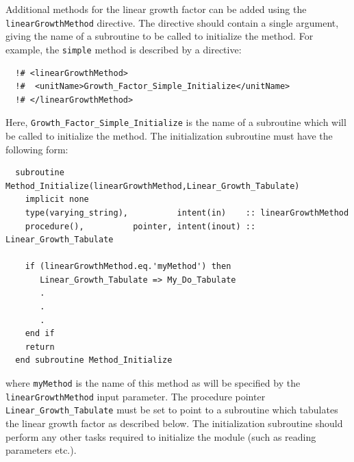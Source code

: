 Additional methods for the linear growth factor can be added using the {\tt linearGrowthMethod} directive. The directive should contain a single argument, giving the name of a subroutine to be called to initialize the method. For example, the {\tt simple} method is described by a directive:
\begin{verbatim}
  !# <linearGrowthMethod>
  !#  <unitName>Growth_Factor_Simple_Initialize</unitName>
  !# </linearGrowthMethod>
\end{verbatim}
Here, {\tt Growth\_Factor\_Simple\_Initialize} is the name of a subroutine which will be called to initialize the method. The initialization subroutine must have the following form:
\begin{verbatim}
  subroutine Method_Initialize(linearGrowthMethod,Linear_Growth_Tabulate)
    implicit none
    type(varying_string),          intent(in)    :: linearGrowthMethod
    procedure(),          pointer, intent(inout) :: Linear_Growth_Tabulate
    
    if (linearGrowthMethod.eq.'myMethod') then
       Linear_Growth_Tabulate => My_Do_Tabulate
       .
       .
       .
    end if
    return
  end subroutine Method_Initialize
\end{verbatim}
where {\tt myMethod} is the name of this method as will be specified by the {\tt linearGrowthMethod} input parameter. The procedure pointer {\tt Linear\_Growth\_Tabulate} must be set to point to a subroutine which tabulates the linear growth factor as described below. The initialization subroutine should perform any other tasks required to initialize the module (such as reading parameters etc.).


